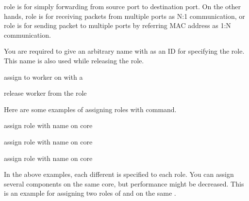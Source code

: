 \documentclass[a4paper,11pt,openany,oneside,english]{sphinxmanual}
\begin{document}
 role is for simply forwarding from source port to destination
port.
On the other hands,  role is for receiving packets from multiple
ports as N:1 communication, or  role is for sending packet to
multiple ports by referring MAC address as 1:N communication.

You are required to give an arbitrary name with as an ID for specifying the role.
This name is also used while releasing the role.

\begin{sphinxVerbatim}[commandchars=\\\{\},formatcom=\footnotesize]
 assign  to worker on  with a 

 release worker  from the role
\end{sphinxVerbatim}

Here are some examples of assigning roles with  command.

\begin{sphinxVerbatim}[commandchars=\\\{\},formatcom=\footnotesize]
 assign  role with name  on core 

 assign  role with name  on core 

 assign  role with name  on core 
\end{sphinxVerbatim}

In the above examples, each different  is specified to each role.
You can assign several components on the same core, but performance might be
decreased. This is an example for assigning two roles of  and
 on the same .
\end{document}
